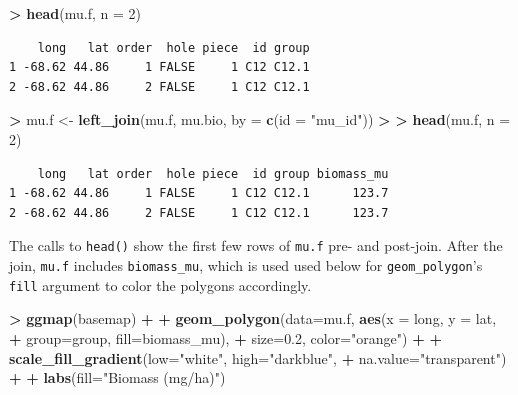 \documentclass[]{krantz}
\makeatletter
\newenvironment{Shaded}{\begin{snugshade}}{\end{snugshade}}
\newcommand{\DataTypeTok}[1]{\textcolor[rgb]{0.27,0.27,0.27}{#1}}
\newcommand{\DecValTok}[1]{\textcolor[rgb]{0.06,0.06,0.06}{#1}}
\newcommand{\ErrorTok}[1]{\textcolor[rgb]{0.14,0.14,0.14}{\textbf{#1}}}
\newcommand{\FloatTok}[1]{\textcolor[rgb]{0.06,0.06,0.06}{#1}}
\newcommand{\KeywordTok}[1]{\textcolor[rgb]{0.27,0.27,0.27}{\textbf{#1}}}
\newcommand{\NormalTok}[1]{#1}
\newcommand{\OperatorTok}[1]{\textcolor[rgb]{0.43,0.43,0.43}{\textbf{#1}}}
\newcommand{\StringTok}[1]{\textcolor[rgb]{0.5,0.5,0.5}{#1}}
\newenvironment{kframe}{%
\medskip{}
\setlength{\fboxsep}{.8em}
 \def\at@end@of@kframe{}%
 \ifinner\ifhmode%
  \def\at@end@of@kframe{\end{minipage}}%
  \begin{minipage}{\columnwidth}%
 \fi\fi%
 \def\FrameCommand##1{\hskip\@totalleftmargin \hskip-\fboxsep
 \colorbox{shadecolor}{##1}\hskip-\fboxsep
     \hskip-\linewidth \hskip-\@totalleftmargin \hskip\columnwidth}%
 \MakeFramed {\advance\hsize-\width
   \@totalleftmargin\z@ \linewidth\hsize
   \@setminipage}}%
 {\par\unskip\endMakeFramed%
 \at@end@of@kframe}
\renewenvironment{Shaded}{\begin{kframe}}{\end{kframe}}
\makeatother
\begin{document}
\begin{Shaded}
\begin{Highlighting}[]
\OperatorTok{>}\StringTok{ }\KeywordTok{head}\NormalTok{(mu.f, }\DataTypeTok{n =} \DecValTok{2}\NormalTok{)}
\end{Highlighting}
\end{Shaded}

\begin{verbatim}
    long   lat order  hole piece  id group
1 -68.62 44.86     1 FALSE     1 C12 C12.1
2 -68.62 44.86     2 FALSE     1 C12 C12.1
\end{verbatim}

\begin{Shaded}
\begin{Highlighting}[]
\OperatorTok{>}\StringTok{ }\NormalTok{mu.f <-}\StringTok{ }\KeywordTok{left_join}\NormalTok{(mu.f, mu.bio, }\DataTypeTok{by =} \KeywordTok{c}\NormalTok{(}\DataTypeTok{id =} \StringTok{"mu_id"}\NormalTok{))}
\OperatorTok{>}\StringTok{ }
\ErrorTok{>}\StringTok{ }\KeywordTok{head}\NormalTok{(mu.f, }\DataTypeTok{n =} \DecValTok{2}\NormalTok{)}
\end{Highlighting}
\end{Shaded}

\begin{verbatim}
    long   lat order  hole piece  id group biomass_mu
1 -68.62 44.86     1 FALSE     1 C12 C12.1      123.7
2 -68.62 44.86     2 FALSE     1 C12 C12.1      123.7
\end{verbatim}

The calls to \texttt{head()} show the first few rows of \texttt{mu.f} pre- and post-join. After the join, \texttt{mu.f} includes \texttt{biomass\_mu}, which is used used below for \texttt{geom\_polygon}'s \texttt{fill} argument to color the polygons accordingly.

\begin{Shaded}
\begin{Highlighting}[]
\OperatorTok{>}\StringTok{ }\KeywordTok{ggmap}\NormalTok{(basemap) }\OperatorTok{+}
\OperatorTok{+}\StringTok{     }\KeywordTok{geom_polygon}\NormalTok{(}\DataTypeTok{data=}\NormalTok{mu.f, }\KeywordTok{aes}\NormalTok{(}\DataTypeTok{x =}\NormalTok{ long, }\DataTypeTok{y =}\NormalTok{ lat, }
\OperatorTok{+}\StringTok{                                 }\DataTypeTok{group=}\NormalTok{group, }\DataTypeTok{fill=}\NormalTok{biomass_mu), }
\OperatorTok{+}\StringTok{                  }\DataTypeTok{size=}\FloatTok{0.2}\NormalTok{, }\DataTypeTok{color=}\StringTok{"orange"}\NormalTok{) }\OperatorTok{+}
\OperatorTok{+}\StringTok{     }\KeywordTok{scale_fill_gradient}\NormalTok{(}\DataTypeTok{low=}\StringTok{"white"}\NormalTok{, }\DataTypeTok{high=}\StringTok{"darkblue"}\NormalTok{, }
\OperatorTok{+}\StringTok{                         }\DataTypeTok{na.value=}\StringTok{"transparent"}\NormalTok{) }\OperatorTok{+}
\OperatorTok{+}\StringTok{     }\KeywordTok{labs}\NormalTok{(}\DataTypeTok{fill=}\StringTok{"Biomass (mg/ha)"}\NormalTok{)}
\end{Highlighting}
\end{Shaded}
\end{document}
